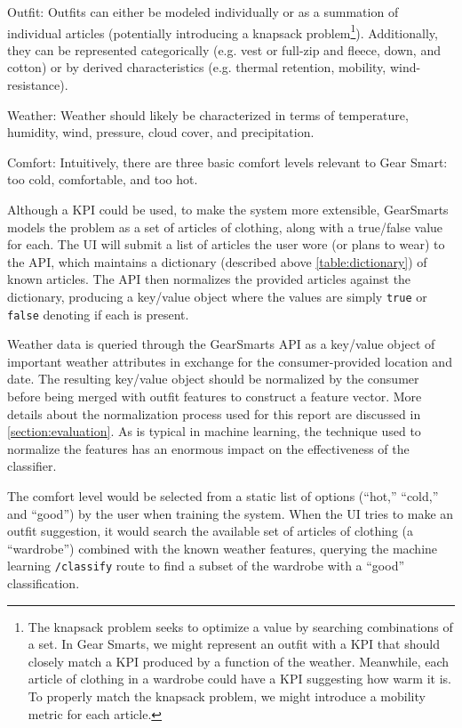 \begin{description}
  \item{Outfit:} Outfits can either be modeled individually or as a summation of individual articles (potentially introducing
  a knapsack problem\footnote{The knapsack problem seeks to optimize a value by searching combinations of a set. In Gear Smarts,
  we might represent an outfit with a KPI that should closely match a KPI produced by a function of the weather. Meanwhile, each
  article of clothing in a wardrobe could have a KPI suggesting how warm it is. To properly match the knapsack problem, we might
  introduce a mobility metric for each article.}).
  Additionally, they can be represented categorically (e.g. vest or full-zip and
  fleece, down, and cotton) or by derived characteristics (e.g. thermal retention, mobility, wind-resistance).
  \item{Weather:} Weather should likely be characterized in terms of temperature, humidity, wind, pressure,
  cloud cover, and precipitation.
  \item{Comfort:} Intuitively, there are three basic comfort levels relevant to Gear Smart: too cold, comfortable, and too hot.
\end{description}

Although a KPI could be used, to make the system more extensible, GearSmarts models the problem as a set of
articles of clothing, along with a true/false value for each. The UI will submit a list of articles the user wore (or
plans to wear) to the API, which maintains a dictionary (described above \ref{table:dictionary}) of known articles. The
API then normalizes the provided articles against the dictionary, producing a key/value object where the values are
simply \texttt{true} or \texttt{false} denoting if each is present.

Weather data is queried through the GearSmarts API as a key/value object of important
weather attributes in exchange for the consumer-provided location and date. The resulting key/value object should be
normalized by the consumer before being merged with outfit features to construct a feature vector. More details about
the normalization process used for this report are discussed in \ref{section:evaluation}. As is typical in
machine learning, the technique used to normalize the features has an enormous impact on the effectiveness of the
classifier.

The comfort level would be selected from a static list of options (``hot,'' ``cold,'' and ``good'') by the user when
training the system. When the UI tries to make an outfit suggestion, it would search the available set of articles of
clothing (a ``wardrobe'') combined with the known weather features, querying the machine learning \texttt{/classify}
route to find a subset of the wardrobe with a ``good'' classification.
